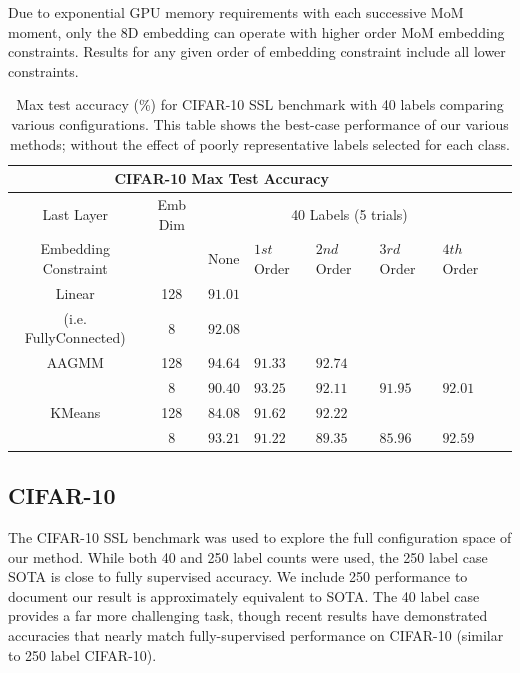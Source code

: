 \documentclass[10pt,twocolumn,letterpaper]{article}
\begin{document}
Due to exponential GPU memory requirements with each successive MoM moment, only the 8D embedding can operate with higher order MoM embedding constraints. Results for any given order of embedding constraint include all lower constraints.

\begin{table}[ht!]
	\begin{tabularx}{\textwidth}{c|c|XXXXXX}
		\multicolumn{6}{c}{CIFAR-10 Max Test Accuracy} \\ \hline\hline
		Last Layer &   Emb Dim   & \multicolumn{5}{c}{40 Labels (5 trials)}            \\ 
		\hline
		Embedding Constraint  &  & None & $1st$ Order & $2nd$ Order & $3rd$ Order & $4th$ Order  \\ 
		\hline
		Linear & 128  & $91.01$   &  &  &  &   \\
		(i.e. FullyConnected) & 8  & $92.08$    &  &  &  &   \\
		\hline
		AAGMM  & 128  & $\boldsymbol{94.64}$    & $91.33$   & $92.74$   &  &  \\
		& 8  & $90.40$    & $93.25$   & $92.11$   & $91.95$  & $92.01$  \\
		\hline
		KMeans & 128  & $84.08$    & $91.62$   & $92.22$  &  &  \\
		& 8  & $\boldsymbol{93.21}$    & $91.22$  & $89.35$  & $85.96$  & $92.59$  \\
	\end{tabularx}
	\caption{Max test accuracy (\%) for CIFAR-10 SSL benchmark with 40 labels comparing various configurations. This table shows the best-case performance of our various methods; without the effect of poorly representative labels selected for each class. }
	\label{tablemaxcf10}
\end{table}

\subsection{CIFAR-10}


The CIFAR-10 SSL benchmark was used to explore the full configuration space of our method.
While both 40 and 250 label counts were used, the 250 label case SOTA is close to fully supervised accuracy.
We include 250 performance to document our result is approximately equivalent to SOTA. 
The 40 label case provides a far more challenging task, though recent results have demonstrated accuracies that nearly match fully-supervised performance on CIFAR-10 (similar to 250 label CIFAR-10).
\end{document}
